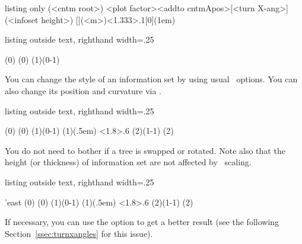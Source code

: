 \begin{tcblisting}{listing only}
  (<cntm root>)
                <plot factor>{<addto cntmApos>}[<turn X-ang>](<infoset height>)
  [](<m>)<1.333>{.1}[0](1em)
\end{tcblisting}


\begin{tcblisting}{listing outside text, righthand width=.25\linewidth}
\begin{istgame}[scale=1.2]
\istrootcntmA(0)  \istbA        \endist
\cntmAInfosetO(0)
\xtdistance{10mm}{20mm}
\istroot(1)(0-1)  \istb  \istb  \endist
\end{istgame}
\end{tcblisting}

You can change the style of an information set by using usual \TikZ\ options.
You can also change its position and curvature via \cmd{\cntmApreset}.


\begin{tcblisting}{listing outside text, righthand width=.25\linewidth}
\begin{istgame}[scale=1.2]
\cntmdistance*{10mm}{20mm}
\istrootcntmA(0)       \istbA  \endist
{}(0)
\istrootcntmA(1)(0-1)  \istbA  \endist
\cntmAInfosetO[solid,fill=green](1)(.5em)
\cntmApreset<1.8>{.6}
\istrootcntmA(2)(1-1)  \istbA  \endist
\cntmAInfosetO[fill=blue!20](2)
\end{istgame}
\end{tcblisting}

You do not need to bother if a tree is swapped or rotated.
Note also that the height (or thickness) of information set are not affected by \TikZ\ scaling.

\begin{tcblisting}{listing outside text, righthand width=.25\linewidth}
\begin{istgame}[scale=.8]
\setistgrowdirection'{east}
\cntmdistance*{10mm}{20mm}
\istrootcntmA(0)       \istbA  \endist
{}(0)
\istrootcntmA(1)(0-1)  \istbA  \endist
\cntmAInfosetO[solid,fill=green](1)(.5em)
\cntmApreset<1.8>{.6}
\istrootcntmA(2)(1-1)  \istbA  \endist
\cntmAInfosetO[fill=blue!20](2)
\end{istgame}
\end{tcblisting}


If necessary, you can use the  option to get a better result (see the following Section~\ref{ssec:turnxangles} for this issue).

